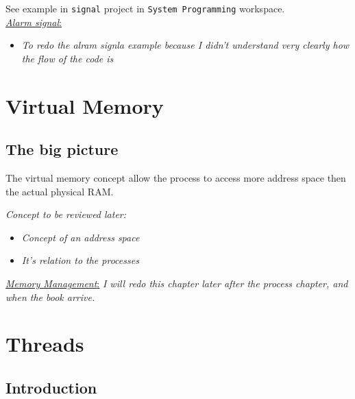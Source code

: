 \documentclass[12pt,a4paper]{book}
\begin{document}
See example in \verb|signal| project in \verb|System Programming| workspace.\\

 \underline{\textit{Alarm signal}:}

\begin{itemize}

\item \textit{To redo the alram signla example because I didn't understand very clearly how the flow of the code is}

\end{itemize}



\chapter{Virtual Memory}


\section{The big picture}

The virtual memory concept allow the process to access more address space then the actual physical RAM.

\textit{Concept to be reviewed later:}

\begin{itemize}

\item \textit{Concept of an address space}

\item \textit{It's relation to the processes}  


\end{itemize}


 \underline{\textit{Memory Management}:} \textit{I will redo this chapter later after the process chapter, and when the book arrive.} 



\chapter{Threads}

\section{Introduction}
\end{document}
